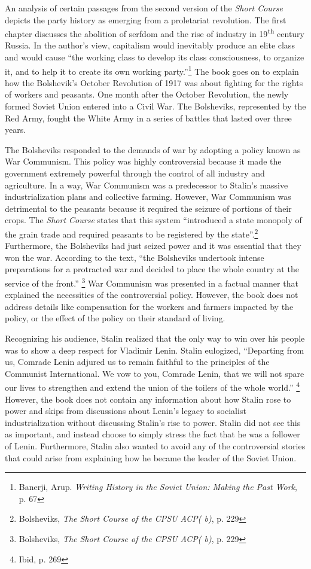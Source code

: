 \documentclass[a4paper, twocolumn]{article}
\begin{document}
An analysis of certain passages from the second version of the \emph{Short
Course} depicts the party history as emerging from a proletariat
revolution. The first chapter discusses the abolition of serfdom and
the rise of industry in 19\textsuperscript{th} century Russia. In the author's view,
capitalism would inevitably produce an elite class and would cause
``the working class to develop its class consciousness, to organize it,
and to help it to create its own working party.''\footnote{Banerji, Arup. \emph{Writing History in the Soviet Union: Making the Past Work}, p. 67} The book goes on to
explain how the Bolshevik's October Revolution of 1917 was about
fighting for the rights of workers and peasants. One month after the
October Revolution, the newly formed Soviet Union entered into a Civil
War.  The Bolsheviks, represented by the Red Army, fought the White
Army in a series of battles that lasted over three years.

The Bolsheviks responded to the demands of war by adopting a policy
known as War Communism. This policy was highly controversial because
it made the government extremely powerful through the control of all
industry and agriculture. In a way, War Communism was a predecessor to
Stalin's massive industrialization plans and collective farming.
However, War Communism was detrimental to the peasants because it
required the seizure of portions of their crops. The \emph{Short Course}
states that this system ``introduced a state monopoly of the grain
trade and required peasants to be registered by the state''.\footnote{Bolsheviks, \emph{The Short Course of the CPSU ACP( b)}, p. 229}
Furthermore, the Bolsheviks had just seized power and it was essential
that they won the war. According to the text, ``the Bolsheviks
undertook intense preparations for a protracted war and
decided to place the whole country at the service of the
front.'' \footnote{Bolsheviks, \emph{The Short Course of the CPSU ACP( b)}, p. 229} War Communism was presented in a factual manner that
explained the necessities of the controversial policy. However, the
book does not address details like compensation for the workers and
farmers impacted by the policy, or the effect of the policy on their
standard of living.

Recognizing his audience, Stalin realized that the only way to win
over his people was to show a deep respect for Vladimir Lenin. Stalin
eulogized, ``Departing from us, Comrade Lenin adjured us to remain
faithful to the principles of the Communist International. We vow to
you, Comrade Lenin, that we will not spare our lives to strengthen and
extend the union of the toilers of the whole world.'' \footnote{Ibid, p. 269} However, the
book does not contain any information about how Stalin rose to power
and skips from discussions about Lenin's legacy to socialist
industrialization without discussing Stalin's rise to power. Stalin
did not see this as important, and instead choose to simply stress the fact
that he was a follower of Lenin. Furthermore, Stalin also wanted to
avoid any of the controversial stories that could arise from
explaining how he became the leader of the Soviet Union.
\end{document}
